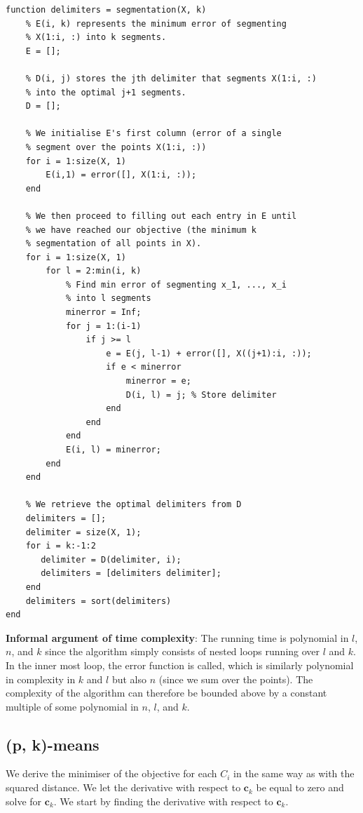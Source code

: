 \documentclass[11pt]{article}
\begin{document}
    \begin{lstlisting}
function delimiters = segmentation(X, k)
    % E(i, k) represents the minimum error of segmenting
    % X(1:i, :) into k segments.
    E = [];
    
    % D(i, j) stores the jth delimiter that segments X(1:i, :)  
    % into the optimal j+1 segments.
    D = [];
    
    % We initialise E's first column (error of a single 
    % segment over the points X(1:i, :))
    for i = 1:size(X, 1)
        E(i,1) = error([], X(1:i, :));
    end
    
    % We then proceed to filling out each entry in E until
    % we have reached our objective (the minimum k 
    % segmentation of all points in X).
    for i = 1:size(X, 1)
        for l = 2:min(i, k)
            % Find min error of segmenting x_1, ..., x_i 
            % into l segments
            minerror = Inf;
            for j = 1:(i-1)
                if j >= l
                    e = E(j, l-1) + error([], X((j+1):i, :));
                    if e < minerror
                        minerror = e;
                        D(i, l) = j; % Store delimiter
                    end
                end
            end
            E(i, l) = minerror;
        end
    end
    
    % We retrieve the optimal delimiters from D
    delimiters = [];
    delimiter = size(X, 1);
    for i = k:-1:2
       delimiter = D(delimiter, i);
       delimiters = [delimiters delimiter];
    end
    delimiters = sort(delimiters)
end\end{lstlisting}

    \textbf{Informal argument of time complexity}: The running time is polynomial in $l$, $n$, and $k$ since the algorithm simply consists of nested loops running over $l$ and $k$. In the inner most loop, the error function is called, which is similarly polynomial in complexity in $k$ and $l$ but also $n$ (since we sum over the points). The complexity of the algorithm can therefore be bounded above by a constant multiple of some polynomial in $n$, $l$, and $k$.
    

\subsection{(p, k)-means}
    
    We derive the minimiser of the objective for each $C_i$ in the same way as with the squared distance. We let the derivative with respect to $\mathbf{c}_k$ be equal to zero and solve for $\mathbf{c}_k$. We start by finding the derivative with respect to $\mathbf{c}_k$. 
    
\end{document}
